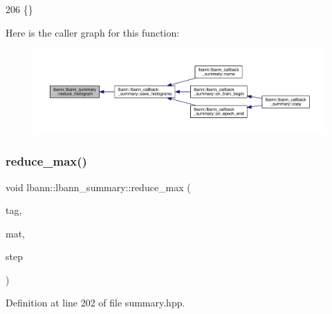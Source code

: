 \begin{DoxyCode}
206 \{\}
\end{DoxyCode}
Here is the caller graph for this function\+:\nopagebreak
\begin{figure}[H]
\begin{center}
\leavevmode
\includegraphics[width=350pt]{classlbann_1_1lbann__summary_a6303fa270a3b7179f361b47418f812ef_icgraph}
\end{center}
\end{figure}
\mbox{\label{classlbann_1_1lbann__summary_abebb44b0ea225aba2b98b24ccc8eb427}} 
\subsubsection{\texorpdfstring{reduce\+\_\+max()}{reduce\_max()}}
{\footnotesize\ttfamily void lbann\+::lbann\+\_\+summary\+::reduce\+\_\+max (\begin{DoxyParamCaption}\item[{const std\+::string}]{tag,  }\item[{const \hyperlink{base_8hpp_a9a697a504ae84010e7439ffec862b470}{Abs\+Dist\+Mat} \&}]{mat,  }\item[{int}]{step }\end{DoxyParamCaption})\hspace{0.3cm}{\ttfamily [inline]}}



Definition at line 202 of file summary.\+hpp.


